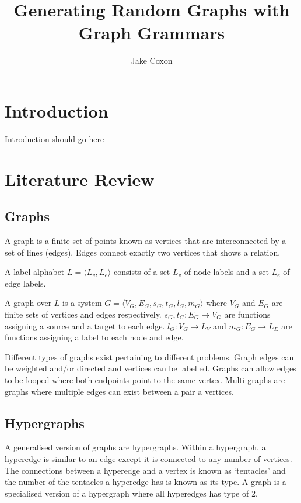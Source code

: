 \documentclass{article}
\begin{document}
\title{Generating Random Graphs with Graph Grammars}
\author{Jake Coxon}
\maketitle

\tableofcontents

\section{Introduction}
Introduction should go here

\section{Literature Review}

\subsection{Graphs}
  

  A graph is a finite set of points known as vertices that are interconnected by a set of lines (edges). Edges connect exactly two vertices that shows a relation.

  A label alphabet $L = \langle L_v, L_e \rangle$ consists of a set $L_v$ of node labels and a set $L_e$ of edge labels.

  A graph over $L$ is a system $G = \langle V_G, E_G, s_G, t_G, l_G, m_G \rangle$ where $V_G$ and $E_G$ are finite sets of vertices and edges respectively. $s_G, t_G : E_G \to V_G$ are functions assigning a source and a target to each edge. $l_G : V_G \to L_V$ and $m_G : E_G \to L_E$ are functions assigning a label to each node and edge\cite{Detlef1}.

  Different types of graphs exist pertaining to different problems. Graph edges can be weighted and/or directed and vertices can be labelled. Graphs can allow edges to be looped where both endpoints point to the same vertex. Multi-graphs are graphs where multiple edges can exist between a pair a vertices.

\subsection{Hypergraphs}
  

  A generalised version of graphs are hypergraphs. Within a hypergraph, a hyperedge is similar to an edge except it is connected to any number of vertices. The connections between a hyperedge and a vertex is known as `tentacles' and the number of the tentacles a hyperedge has is known as its type. A graph is a specialised version of a hypergraph where all hyperedges has type of $2$.
\end{document}
